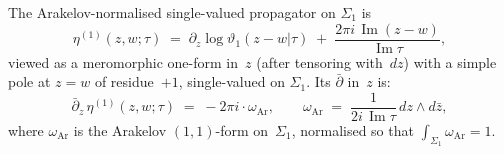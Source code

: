 \begin{proposition}
\label{prop:arakelov-genus-1-derivation}

The Arakelov-normalised single-valued propagator on $\Sigma_1$ is
\begin{equation}\label{eq:eta-1-explicit}
 \eta^{(1)}(z,w;\tau)
 \;=\;
 \partial_z \log\vartheta_1(z-w|\tau)
 \;+\;
 \frac{2\pi i\, \operatorname{Im}(z-w)}{\operatorname{Im}\tau},
\end{equation}
viewed as a meromorphic one-form in~$z$
\textup{(}after tensoring with~$dz$\textup{)}
with a simple pole at $z = w$ of residue~$+1$, single-valued on
$\Sigma_1$. Its $\bar\partial$ in~$z$ is:
\begin{equation}\label{eq:dbar-eta-1}
 \bar\partial_z\, \eta^{(1)}(z,w;\tau)
 \;=\;
 -2\pi i \cdot \omega_{\mathrm{Ar}},
 \qquad
 \omega_{\mathrm{Ar}}
 \;=\;
 \frac{1}{2i\,\operatorname{Im}\tau}\,
 dz \wedge d\bar z,
\end{equation}
where $\omega_{\mathrm{Ar}}$ is the Arakelov $(1,1)$-form on~$\Sigma_1$,
normalised so that $\int_{\Sigma_1}\omega_{\mathrm{Ar}} = 1$.
\end{proposition}

